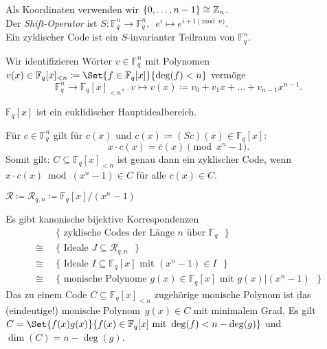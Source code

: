 \documentclass{cheat-sheet}
\newcommand{\F}{\mathbb{F}} %
\newcommand{\divides}{|} %
\begin{document}
\begin{bem}
  Als Koordinaten verwenden wir $\{ 0, \ldots, n-1 \} \cong \mathbb{Z}_n$. \\
  Der \emph{Shift-Operator} ist $S : \F_q^n \to \F_q^n, \enspace e^i \mapsto e^{i+1 \pmod{n}}$. \\
  Ein zyklischer Code ist ein $S$-invarianter Teilraum von $\F_q^n$.
\end{bem}

\begin{nota}
  Wir identifizieren Wörter $v \in \F_q^n$ mit Polynomen $v(x) \in \F_q[x]_{< n} \coloneqq \Set{f \in \F_q[x]}{\deg(f) < n}$ vermöge
  \[
    \F_q^n \to \F_q[x]_{< n}, \enspace
    v \mapsto v(x) \coloneqq v_0 + v_1 x + \ldots + v_{n-1} x^{n-1}.
  \]
\end{nota}

\begin{fakt}
  $\F_q[x]$ ist ein euklidischer Hauptidealbereich.
\end{fakt}

\begin{bem}
  Für $c \in \F_q^n$ gilt für $c(x)$ und $ \overline{c}(x) \coloneqq (S c)(x) \in \F_q[x]$:
  \[
    x \cdot c(x) = \overline{c}(x) \pmod{x^n - 1}.
  \]
  Somit gilt: $C \subseteq \F_q[x]_{< n}$ ist genau dann ein zyklischer Code, wenn $x \cdot c(x) \bmod{(x^n - 1)} \in C$ für alle $c(x) \in C$.
\end{bem}


\begin{nota}
  $\mathcal{R} \coloneqq \mathcal{R}_{q,n} \coloneqq \F_q[x] / (x^n - 1)$
\end{nota}

\begin{satz}
  Es gibt kanonische bijektive Korrespondenzen
  \begin{align*}
    & \{ \text{ zyklische Codes der Länge $n$ über $\F_q$ } \} \\
    \cong \enspace & \{ \text{ Ideale $J \subseteq \mathcal{R}_{q,n}$ } \} \\
    \cong \enspace & \{ \text{ Ideale $I \subseteq \F_q[x]$ mit $(x^n - 1) \in I$ } \} \\
    \cong \enspace & \{ \text{ monische Polynome $g(x) \in \F_q[x]$ mit $g(x) \divides (x^n - 1)$ } \}
  \end{align*}
  Das zu einem Code $C \subseteq \F_q[x]_{< n}$ zugehörige monische Polynom ist das (eindeutige!) monische Polynom~$g(x) \in C$ mit minimalem Grad.
  Es gilt $C = \Set{f(x) g(x)}{f(x) \in \F_q[x] \text{ mit } \deg(f) < n - \deg(g)}$ und $\dim(C) = n - \deg(g)$.
\end{satz}
\end{document}
